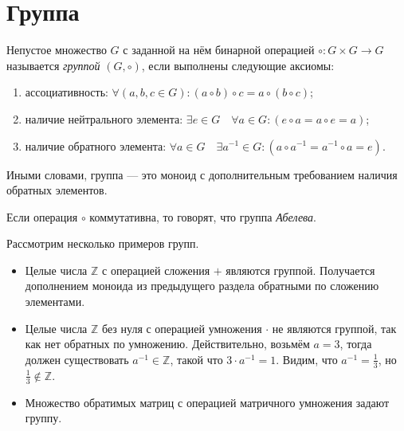\section{Группа}

\begin{definition}
	Непустое множество $G$ с заданной на нём бинарной операцией $\circ: {G} \times {G} \to {G}$ называется \emph{группой} $(G ,\circ)$, если выполнены следующие аксиомы:
	\begin{enumerate}
		\item ассоциативность: $\forall (a,b,c\in G)\colon (a\circ b)\circ c = a\circ (b \circ c)$;
		\item наличие нейтрального элемента: $ \exists e \in G \quad \forall a\in G\colon (e \circ a = a \circ e = a)$;
		\item наличие обратного элемента: $ \forall a\in G\quad \exists a^{-1}\in G\colon (a \circ a^{-1}=a^{-1} \circ a = e)$.
	\end{enumerate}

	Иными словами, группа --- это моноид с дополнительным требованием наличия обратных элементов.
\end{definition}

\begin{definition}
	Если операция $\circ$ коммутативна, то говорят, что группа \textit{Абелева}.
\end{definition}

\begin{example}
	Рассмотрим несколько примеров групп.
	\begin{itemize}
		\item Целые числа $\mathbb{Z}$ с операцией сложения $+$ являются группой. Получается дополнением моноида из предыдущего раздела обратными по сложению элементами.
		\item Целые числа $\mathbb{Z}$ без нуля с операцией умножения $\cdot$ не являются группой, так как нет обратных по умножению. Действительно, возьмём $a = 3$, тогда должен существовать $a^{-1} \in \mathbb{Z}$, такой что $3 \cdot a^{-1} = 1$. Видим, что $a^{-1} = \frac{1}{3}$, но $\frac{1}{3} \notin \mathbb{Z}$.
		\item Множество обратимых матриц с операцией матричного умножения задают группу.
	\end{itemize}
\end{example}

